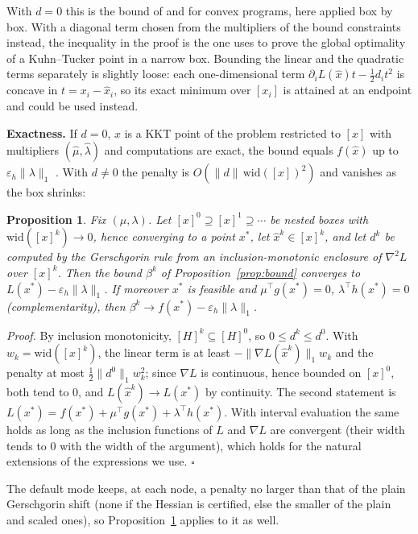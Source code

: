 \documentclass[11pt]{article}
\newtheorem{proposition}{Proposition}
\begin{document}
With $d = 0$ this is the bound of \citet{Jansson2004convex} and
\citet{MessineTrombettoni2019} for convex programs, here applied box by box. With a
diagonal term chosen from the multipliers of the bound constraints instead, the
inequality in the proof is the one \citet[Thm.~1.2]{Neumaier1996} uses to prove the
global optimality of a Kuhn--Tucker point in a narrow box. Bounding
the linear and the quadratic terms separately is slightly loose: each one-dimensional
term $\partial_i L(\hat x) t - \frac12 d_i t^2$ is concave in $t = x_i - \hat x_i$, so
its exact minimum over $[x_i]$ is attained at an endpoint and could be used instead.

\textbf{Exactness.} If $d = 0$, $\hat x$ is a KKT point of the problem restricted to
$[x]$ with multipliers $(\hat\mu, \hat\lambda)$ and computations are exact, the bound
equals $f(\hat x)$ up to $\varepsilon_h\|\lambda\|_1$ \citep[Thm.~2]{Jansson2004convex}.
With $d \neq 0$ the penalty is $O(\|d\|\,\mathrm{wid}([x])^2)$ and vanishes as the box
shrinks:

\begin{proposition}\label{prop:conv}
Fix $(\mu, \lambda)$. Let $[x]^0 \supseteq [x]^1 \supseteq \cdots$ be nested boxes with
$\mathrm{wid}([x]^k) \to 0$, hence converging to a point $x^*$, let
$\hat x^k \in [x]^k$, and let $d^k$ be computed by the Gerschgorin rule from an
inclusion-monotonic enclosure of $\nabla^2 L$ over $[x]^k$. Then the bound
$\beta^k$ of Proposition~\ref{prop:bound} converges to
$L(x^*) - \varepsilon_h \|\lambda\|_1$. If moreover $x^*$ is feasible and
$\mu^\top g(x^*) = 0$, $\lambda^\top h(x^*) = 0$ (complementarity), then
$\beta^k \to f(x^*) - \varepsilon_h \|\lambda\|_1$.
\end{proposition}
\emph{Proof.} By inclusion monotonicity, $[H]^k \subseteq [H]^0$, so
$0 \le d^k \le d^0$. With $w_k = \mathrm{wid}([x]^k)$, the linear term is at least
$-\|\nabla L(\hat x^k)\|_1 w_k$ and the penalty at most $\frac12 \|d^0\|_1 w_k^2$; since
$\nabla L$ is continuous, hence bounded on $[x]^0$, both tend to $0$, and
$L(\hat x^k) \to L(x^*)$ by continuity. The second statement is
$L(x^*) = f(x^*) + \mu^\top g(x^*) + \lambda^\top h(x^*)$. With interval evaluation the
same holds as long as the inclusion functions of $L$ and $\nabla L$ are convergent
(their width tends to $0$ with the width of the argument), which holds for the natural
extensions of the expressions we use. $\square$

The default mode keeps, at each node, a penalty no larger than that of the plain
Gerschgorin shift (none if the Hessian is certified, else the smaller of the plain and
scaled ones), so Proposition~\ref{prop:conv} applies to it as well.
\end{document}
